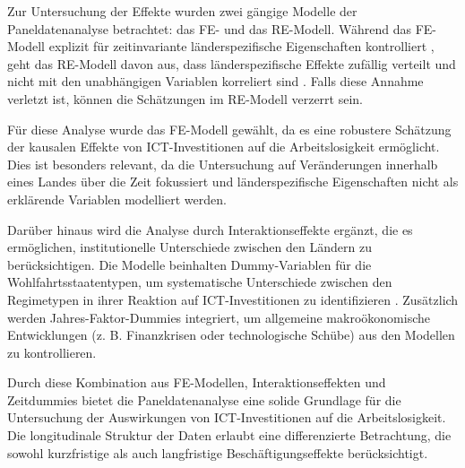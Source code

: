 Zur Untersuchung der Effekte wurden zwei gängige Modelle der Paneldatenanalyse betrachtet: das \ac{FE}- 
und das \ac{RE}-Modell. Während das \ac{FE}-Modell explizit für zeitinvariante länderspezifische 
Eigenschaften kontrolliert \parencite[S. 251–256]{wooldridge2010econometric}, geht das \ac{RE}-Modell 
davon aus, dass länderspezifische Effekte zufällig verteilt und nicht mit den unabhängigen Variablen 
korreliert sind \parencite[S. 17–20]{baltagi2021econometric}. Falls diese Annahme verletzt ist, können 
die Schätzungen im \ac{RE}-Modell verzerrt sein.

Für diese Analyse wurde das \ac{FE}-Modell gewählt, da es eine robustere Schätzung der kausalen Effekte 
von ICT-Investitionen auf die Arbeitslosigkeit ermöglicht. Dies ist besonders relevant, da die 
Untersuchung auf Veränderungen innerhalb eines Landes über die Zeit fokussiert und länderspezifische 
Eigenschaften nicht als erklärende Variablen modelliert werden.

Darüber hinaus wird die Analyse durch Interaktionseffekte ergänzt, die es ermöglichen, institutionelle 
Unterschiede zwischen den Ländern zu berücksichtigen. Die Modelle beinhalten Dummy-Variablen für die 
Wohlfahrtsstaatentypen, um systematische Unterschiede zwischen den Regimetypen in ihrer Reaktion auf 
\ac{ICT}-Investitionen zu identifizieren \parencite{espingandersen1990thethree}. Zusätzlich werden 
Jahres-Faktor-Dummies integriert, um allgemeine makroökonomische Entwicklungen (z. B. Finanzkrisen 
oder technologische Schübe) aus den Modellen zu kontrollieren.

Durch diese Kombination aus \ac{FE}-Modellen, Interaktionseffekten und Zeitdummies bietet die 
Paneldatenanalyse eine solide Grundlage für die Untersuchung der Auswirkungen von \ac{ICT}-Investitionen 
auf die Arbeitslosigkeit. Die longitudinale Struktur der Daten erlaubt eine differenzierte Betrachtung, 
die sowohl kurzfristige als auch langfristige Beschäftigungseffekte berücksichtigt.
